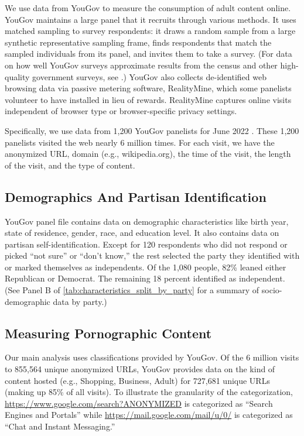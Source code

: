 \documentclass[12pt, letterpaper]{article}
\begin{document}
We use data from YouGov to measure the consumption of adult content online. YouGov maintains a large panel that it recruits through various methods. It uses matched sampling to survey respondents: it draws a random sample from a large synthetic representative sampling frame, finds respondents that match the sampled individuals from its panel, and invites them to take a survey. (For data on how well YouGov surveys approximate results from the census and other high-quality government surveys, see \citet{rivers2009, graham2021advantages, foote2021measuring}.) YouGov also collects de-identified web browsing data via passive metering software, RealityMine, which some panelists volunteer to have installed in lieu of rewards. RealityMine captures online visits independent of browser type or browser-specific privacy settings.

Specifically, we use data from 1,200 YouGov panelists for June 2022 \citep{data-dataverse}. These 1,200 panelists visited the web nearly 6 million times. For each visit, we have the anonymized URL, domain (e.g., wikipedia.org), the time of the visit, the length of the visit, and the type of content. 

\subsection{Demographics And Partisan Identification}
\label{subsec:demographics}
YouGov panel file contains data on demographic characteristics like birth year, state of residence, gender, race, and education level. It also contains data on partisan self-identification. Except for 120 respondents who did not respond or picked ``not sure'' or ``don't know,'' the rest selected the party they identified with or marked themselves as independents. Of the 1,080 people, 82\% leaned either Republican or Democrat. The remaining 18 percent identified as independent. (See Panel B of \cref{tab:characteristics_split_by_party} for a summary of socio-demographic data by party.)

\subsection{Measuring Pornographic Content}
\label{subsec:measuring_porn_content}

Our main analysis uses classifications provided by YouGov. Of the 6 million visits to 855,564 unique anonymized URLs, YouGov provides data on the kind of content hosted (e.g., Shopping, Business, Adult) for 727,681 unique URLs (making up 85\% of all visits). To illustrate the granularity of the categorization, \url{https://www.google.com/search?ANONYMIZED} is categorized as ``Search Engines and Portals'' while \url{https://mail.google.com/mail/u/0/} is categorized as ``Chat and Instant Messaging.'' 
\end{document}
